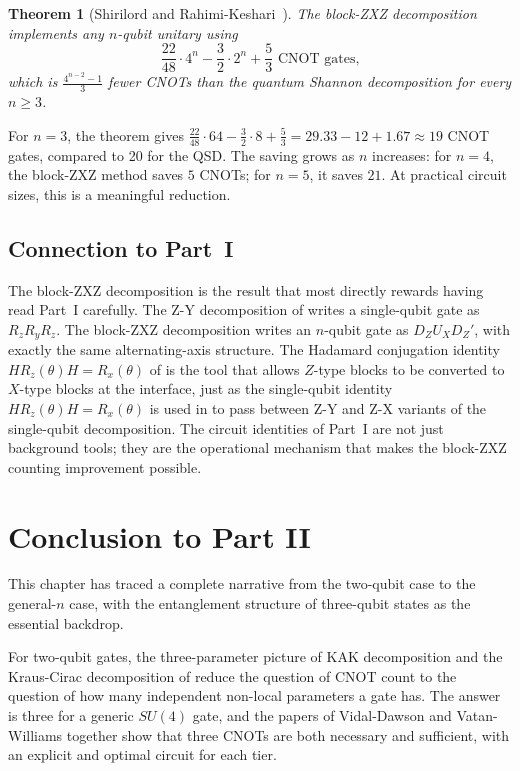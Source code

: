 \documentclass[12pt, a4paper, oneside]{report}
\theoremstyle{plain}
\newtheorem{theorem}{Theorem}[chapter]
\theoremstyle{definition}
\theoremstyle{remark}
\newcommand{\Rx}{R_x}
\newcommand{\Ry}{R_y}
\newcommand{\Rz}{R_z}
\begin{document}
\begin{theorem}[Shirilord and Rahimi-Keshari~\cite{shirilord2024}]
	\label{thm:shirilord}
	The block-ZXZ decomposition implements any $n$-qubit unitary using
	\[
		\frac{22}{48} \cdot 4^n - \frac{3}{2} \cdot 2^n + \frac{5}{3} \text{ CNOT gates,}
	\]
	which is $\frac{4^{n-2}-1}{3}$ fewer CNOTs than the quantum Shannon decomposition for
	every $n \geq 3$.
\end{theorem}

For $n = 3$, the theorem gives $\frac{22}{48} \cdot 64 - \frac{3}{2} \cdot 8 + \frac{5}{3}
	= 29.33 - 12 + 1.67 \approx 19$ CNOT gates, compared to 20 for the QSD. The saving grows
as $n$ increases: for $n = 4$, the block-ZXZ method saves $5$ CNOTs; for $n = 5$, it saves
$21$. At practical circuit sizes, this is a meaningful reduction.

\subsection{Connection to Part~I}

The block-ZXZ decomposition is the result that most directly rewards having read Part~I
carefully. The Z-Y decomposition of  writes a single-qubit gate as
$\Rz\Ry\Rz$. The block-ZXZ decomposition writes an $n$-qubit gate as $D_Z U_X D_Z'$, with
exactly the same alternating-axis structure. The Hadamard conjugation identity
$H\Rz(\theta)H = \Rx(\theta)$ of  is the tool that allows $Z$-type
blocks to be converted to $X$-type blocks at the interface, just as the single-qubit identity
$H\Rz(\theta)H = \Rx(\theta)$ is used in  to pass between Z-Y and Z-X
variants of the single-qubit decomposition. The circuit identities of Part~I are not just
background tools; they are the operational mechanism that makes the block-ZXZ counting
improvement possible.


\section{Conclusion to Part II}
\label{sec:ch3-summary}

This chapter has traced a complete narrative from the two-qubit case to the general-$n$
case, with the entanglement structure of three-qubit states as the essential backdrop.

For two-qubit gates, the three-parameter picture of KAK decomposition and the Kraus-Cirac
decomposition of  reduce the question of CNOT count to the question
of how many independent non-local parameters a gate has. The answer is three for a generic
$SU(4)$ gate, and the papers of Vidal-Dawson and Vatan-Williams together show that three
CNOTs are both necessary and sufficient, with an explicit and optimal circuit for each tier.
\end{document}
